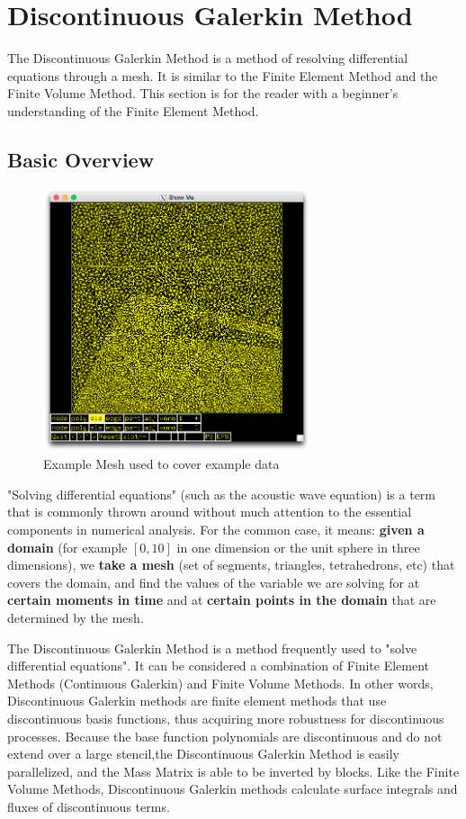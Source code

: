\newpage
\section{Discontinuous Galerkin Method}

The Discontinuous Galerkin Method is a method of resolving differential equations through a mesh. It is similar to the Finite Element Method and the Finite Volume Method. This section is for the reader with a beginner's understanding of the Finite Element Method.

\subsection{Basic Overview}


\begin{figure}[ht]
\centering
\includegraphics[width=0.7\textwidth]{Images/Example-Mesh.png}
\caption{Example Mesh used to cover example data}
\label{fig:couches5-mesh}
\end{figure}

"Solving differential equations" (such as the acoustic wave equation) is a term that is commonly thrown around without much attention to the essential components in numerical analysis. For the common case, it means: \textbf{given a domain} (for example $[0,10]$ in one dimension or the unit sphere in three dimensions), we \textbf{take a mesh} (set of segments, triangles, tetrahedrons, etc) that covers the domain, and find the values of the variable we are solving for at \textbf{certain moments in time} and at \textbf{certain points in the domain} that are determined by the mesh.

The Discontinuous Galerkin Method is a method frequently used to "solve differential equations". It can be considered a combination of Finite Element Methods (Continuous Galerkin) and Finite Volume Methods. In other words, Discontinuous Galerkin methods are finite element methods that use discontinuous basis functions, thus acquiring more robustness for discontinuous processes. Because the base function polynomials are discontinuous and do not extend over a large stencil,the  Discontinuous Galerkin Method is easily parallelized, and the Mass Matrix is able to be inverted by blocks. Like the Finite Volume Methods, Discontinuous Galerkin methods calculate surface integrals and fluxes of discontinuous terms.

